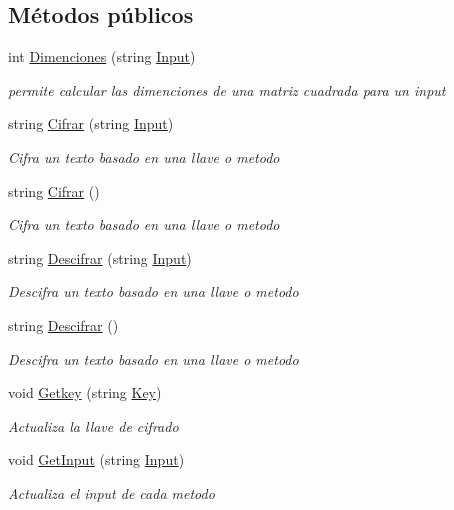 \subsection*{Métodos públicos}
\begin{DoxyCompactItemize}
\item 
int \hyperlink{class_cifrado_1_1_transposicion_a8df16c3d60a6f57d8cf40b17a5f40925}{Dimenciones} (string \hyperlink{class_cifrado_1_1_transposicion_ae35952dd0b3f5c626fa4f7c084428f8a}{Input})
\begin{DoxyCompactList}\small\item\em permite calcular las dimenciones de una matriz cuadrada para un input \end{DoxyCompactList}\item 
string \hyperlink{class_cifrado_1_1_transposicion_a34feeb193fcf5f9bf3385043dae4b4c8}{Cifrar} (string \hyperlink{class_cifrado_1_1_transposicion_ae35952dd0b3f5c626fa4f7c084428f8a}{Input})
\begin{DoxyCompactList}\small\item\em Cifra un texto basado en una llave o metodo \end{DoxyCompactList}\item 
string \hyperlink{class_cifrado_1_1_transposicion_a3d6021ac06c306a6943e88c3678d97cf}{Cifrar} ()
\begin{DoxyCompactList}\small\item\em Cifra un texto basado en una llave o metodo \end{DoxyCompactList}\item 
string \hyperlink{class_cifrado_1_1_transposicion_a45a8f6d97d2afdf5691c7197ae0187c4}{Descifrar} (string \hyperlink{class_cifrado_1_1_transposicion_ae35952dd0b3f5c626fa4f7c084428f8a}{Input})
\begin{DoxyCompactList}\small\item\em Descifra un texto basado en una llave o metodo \end{DoxyCompactList}\item 
string \hyperlink{class_cifrado_1_1_transposicion_ac2934aaba73bbaca8e5da6b788cf10b2}{Descifrar} ()
\begin{DoxyCompactList}\small\item\em Descifra un texto basado en una llave o metodo \end{DoxyCompactList}\item 
void \hyperlink{class_cifrado_1_1_transposicion_ab35db490c8543ccb453b4384ad4e236c}{Getkey} (string \hyperlink{class_cifrado_1_1_transposicion_ada94313eb5cb29e6c95ade7bd2f8306f}{Key})
\begin{DoxyCompactList}\small\item\em Actualiza la llave de cifrado \end{DoxyCompactList}\item 
void \hyperlink{class_cifrado_1_1_transposicion_a41f7391ffcd850e2aebf9852248d6d8d}{Get\+Input} (string \hyperlink{class_cifrado_1_1_transposicion_ae35952dd0b3f5c626fa4f7c084428f8a}{Input})
\begin{DoxyCompactList}\small\item\em Actualiza el input de cada metodo \end{DoxyCompactList}\end{DoxyCompactItemize}
